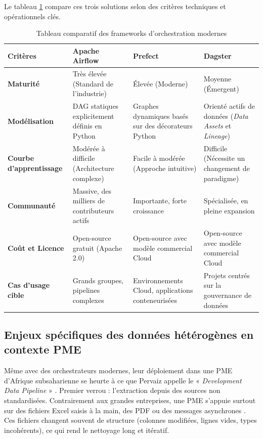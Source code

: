 Le tableau \ref{tab:comparatif_orchestrateurs} compare ces trois solutions selon des critères techniques et opérationnels clés.

\begin{table}[htbp]
\centering
\caption{Tableau comparatif des frameworks d'orchestration modernes}
\label{tab:comparatif_orchestrateurs}
\small
\begin{tabular}{|p{2.5cm}|p{3.2cm}|p{3.2cm}|p{3.2cm}|}
\hline
\textbf{Critères} & \textbf{Apache Airflow} & \textbf{Prefect} & \textbf{Dagster} \\ \hline
\textbf{Maturité} & Très élevée (Standard de l'industrie) & Élevée (Moderne) & Moyenne (Émergent) \\ \hline
\textbf{Modélisation} & DAG statiques explicitement définis en Python & Graphes dynamiques basés sur des décorateurs Python & Orienté actifs de données (\textit{Data Assets} et \textit{Lineage}) \\ \hline
\textbf{Courbe d'apprentissage} & Modérée à difficile (Architecture complexe) & Facile à modérée (Approche intuitive) & Difficile (Nécessite un changement de paradigme) \\ \hline
\textbf{Communauté} & Massive, des milliers de contributeurs actifs & Importante, forte croissance & Spécialisée, en pleine expansion \\ \hline
\textbf{Coût et Licence} & Open-source gratuit (Apache 2.0) & Open-source avec modèle commercial Cloud & Open-source avec modèle commercial Cloud \\ \hline
\textbf{Cas d'usage cible} & Grands groupes, pipelines complexes & Environnements Cloud, applications conteneurisées & Projets centrés sur la gouvernance de données \\ \hline
\end{tabular}
\end{table}

\subsection{Enjeux spécifiques des données hétérogènes en contexte PME}

Même avec des orchestrateurs modernes, leur déploiement dans une PME d'Afrique subsaharienne se heurte à ce que Pervaiz appelle le « \textit{Development Data Pipeline} » \cite{pervaizUnderstandingChallengesData2019}. Premier verrou : l'extraction depuis des sources non standardisées. Contrairement aux grandes entreprises, une PME s'appuie surtout sur des fichiers Excel saisis à la main, des PDF ou des messages asynchrones \cite{pervaizUnderstandingChallengesData2019}. Ces fichiers changent souvent de structure (colonnes modifiées, lignes vides, types incohérents), ce qui rend le nettoyage long et itératif.

